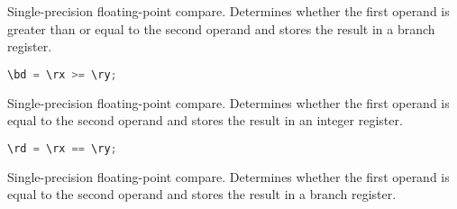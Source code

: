 Single-precision floating-point compare. Determines whether the first operand is greater than or equal to the second operand and stores
the result in a branch register.

\begin{lstlisting}[numbers=none, basicstyle=\ttfamily\footnotesize, language=C++]
\bd = \rx >= \ry;
\end{lstlisting}

%

%

Single-precision floating-point compare. Determines whether the first operand is equal to the second operand and stores
the result in an integer register.

\begin{lstlisting}[numbers=none, basicstyle=\ttfamily\footnotesize, language=C++]
\rd = \rx == \ry;
\end{lstlisting}

Single-precision floating-point compare. Determines whether the first operand is equal to the second operand and stores
the result in a branch register.

